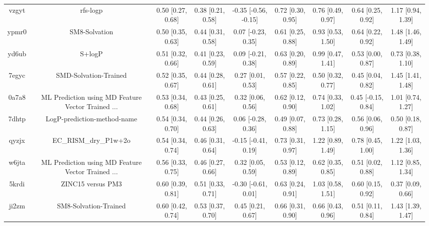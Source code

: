 \documentclass{article}
\begin{document}
\begin{center}
\begin{longtable}{|ccccccccc|}
 vzgyt &                                           rfs-logp &  0.50 [0.27, 0.68] &  0.38 [0.21, 0.58] &  -0.35 [-0.56, -0.15] &  0.72 [0.30, 0.95] &    0.76 [0.49, 0.97] &    0.64 [0.25, 0.92] &     1.17 [0.94, 1.39] \\
 ypmr0 &                                      SM8-Solvation &  0.50 [0.35, 0.63] &  0.44 [0.31, 0.58] &    0.07 [-0.23, 0.35] &  0.61 [0.25, 0.88] &    0.93 [0.53, 1.50] &    0.64 [0.22, 0.92] &     1.48 [1.46, 1.49] \\
 yd6ub &                                             S+logP &  0.51 [0.32, 0.66] &  0.41 [0.23, 0.59] &    0.09 [-0.21, 0.38] &  0.63 [0.20, 0.89] &    0.99 [0.47, 1.41] &    0.53 [0.00, 0.87] &     0.73 [0.38, 1.10] \\
 7egyc &                              SMD-Solvation-Trained &  0.52 [0.35, 0.67] &  0.44 [0.28, 0.61] &     0.27 [0.01, 0.53] &  0.57 [0.22, 0.85] &    0.50 [0.32, 0.77] &    0.45 [0.04, 0.82] &     1.45 [1.41, 1.48] \\
 0a7a8 &  ML Prediction using MD Feature Vector Trained ... &  0.53 [0.34, 0.68] &  0.43 [0.25, 0.61] &     0.32 [0.06, 0.56] &  0.62 [0.12, 0.90] &    0.74 [0.33, 1.02] &   0.45 [-0.15, 0.84] &     1.01 [0.74, 1.27] \\
 7dhtp &                        LogP-prediction-method-name &  0.54 [0.34, 0.70] &  0.44 [0.26, 0.63] &    0.06 [-0.28, 0.36] &  0.49 [0.07, 0.88] &    0.73 [0.28, 1.15] &    0.56 [0.06, 0.96] &     0.50 [0.18, 0.87] \\
 qyzjx &                              EC\_RISM\_dry\_P1w+2o &  0.54 [0.34, 0.74] &  0.46 [0.31, 0.64] &   -0.15 [-0.41, 0.19] &  0.73 [0.31, 0.97] &    1.22 [0.89, 1.49] &    0.78 [0.45, 1.00] &     1.22 [1.03, 1.36] \\
 w6jta &  ML Prediction using MD Feature Vector Trained ... &  0.56 [0.33, 0.75] &  0.46 [0.27, 0.66] &     0.32 [0.05, 0.59] &  0.53 [0.12, 0.89] &    0.62 [0.35, 0.85] &    0.51 [0.02, 0.88] &     1.12 [0.85, 1.34] \\
 5krdi &                                  ZINC15 versus PM3 &  0.60 [0.39, 0.81] &  0.51 [0.33, 0.71] &   -0.30 [-0.61, 0.01] &  0.63 [0.24, 0.91] &    1.03 [0.58, 1.51] &    0.60 [0.15, 0.92] &     0.37 [0.09, 0.66] \\
 ji2zm &                              SM8-Solvation-Trained &  0.60 [0.42, 0.74] &  0.53 [0.37, 0.70] &     0.45 [0.21, 0.67] &  0.66 [0.31, 0.90] &    0.66 [0.43, 0.96] &    0.51 [0.11, 0.84] &     1.43 [1.39, 1.47] \\

\end{longtable}
\end{center}
\end{document}
